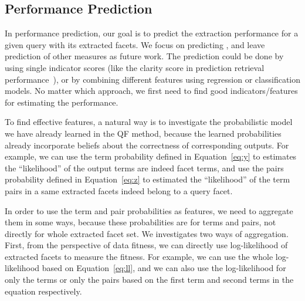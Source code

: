 \subsection{Performance Prediction}
In performance prediction, our goal is to predict the extraction performance for a given query with its extracted facets. We focus on predicting \PRF, and leave prediction of other measures as future work. The prediction could be done by using single indicator scores (like the clarity score in prediction retrieval performance~\cite{cronen2002predicting}), or by combining different features using regression or classification models. No matter which approach, we first need to find good indicators/features for estimating the performance. 

To find effective features, a natural way is to investigate the probabilistic model we have already learned in the QF method, because the learned probabilities already incorporate beliefs about the correctness of corresponding outputs. For example, we can use the term probability defined in Equation~\ref{eq:y} to estimates the ``likelihood'' of the output terms are indeed facet terms, and use the pairs probability defined in Equation~\ref{eq:z} to estimated the ``likelihood'' of the term pairs in a same extracted facets indeed belong to a query facet. 

In order to use the term and pair probabilities as features, we need to aggregate them in some ways, because these probabilities are for terms and pairs, not directly for whole extracted facet set. We investigates two ways of aggregation. First, from the perspective of data fitness, we can directly use log-likelihood of extracted facets to measure the fitness. For example, we can use the whole log-likelihood based on Equation~\ref{eq:ll}, and we can also use the log-likelihood for only the terms or only the pairs based on the first term and second terms in the equation respectively. 

